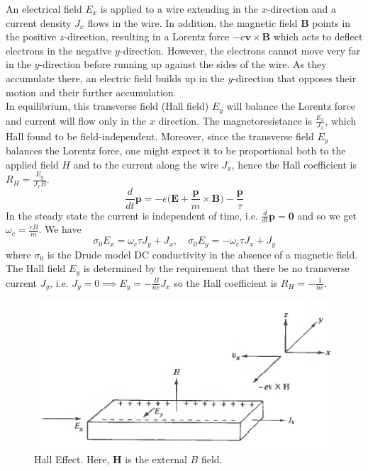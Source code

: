 \documentclass[a4paper]{article}
\begin{document}
\begin{Note}
An electrical field $E_x$ is applied to a wire extending in the $x$-direction and a current density $J_x$ flows in the wire. In addition, the magnetic field $\mathbf{B}$ points in the positive $z$-direction, resulting in a Lorentz force $-e\mathbf{v}\times\mathbf{B}$ which acts to deflect electrons in the negative $y$-direction. However, the electrons cannot move very far in the $y$-direction before running up against the sides of the wire. As they accumulate there, an electric field builds up in the $y$-direction that opposes their motion and their further accumulation.\\[5pt]
In equilibrium, this transverse field (Hall field) $E_y$ will balance the Lorentz force and current will flow only in the $x$ direction. The magnetoresistance is $\frac{E_x}{J_x}$, which Hall found to be field-independent. Moreover, since the transverse field $E_y$ balances the Lorentz force, one might expect it to be proportional both to the applied field $H$ and to the current along the wire $J_x$, hence the Hall coefficient is $R_H=\frac{E_y}{J_xB}$.
$$\frac{d}{dt}\mathbf{p}=-e\bigg(\mathbf{E}+\frac{\mathbf{p}}{m}\times\mathbf{B}\bigg)-\frac{\mathbf{p}}{\tau}$$
In the steady state the current is independent of time, i.e. $\frac{d}{dt}\mathbf{p}=\boldsymbol{0}$ and so we get $\omega_c=\frac{eB}{m}$. We have
$$\sigma_0E_x=\omega_c\tau J_y+J_x,\quad\sigma_0E_y=-\omega_c\tau J_x+J_y$$
where $\sigma_0$ is the Drude model DC conductivity in the absence of a magnetic field. The Hall field $E_y$ is determined by the requirement that there be no transverse current $J_y$, i.e. $J_y=0\implies E_y=-\frac{B}{ne}J_x$ so the Hall coefficient is $R_H=-\frac{1}{ne}$.
\end{Note}
\begin{figure}[H]
    \centering
    \includegraphics[scale=0.85]{halleffect.PNG}
    \caption{Hall Effect. Here, $\mathbf{H}$ is the external $B$ field. \cite{ashcroft1976solid}}
\end{figure}
\end{document}
